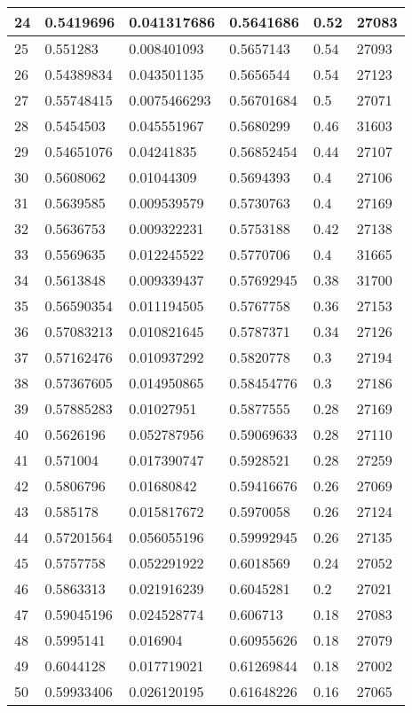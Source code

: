 \begin{longtable}{|l|l|l|l|l|l|}
24 & 0.5419696 & 0.041317686 & 0.5641686 & 0.52 & 27083 \\ \hline 
25 & 0.551283 & 0.008401093 & 0.5657143 & 0.54 & 27093 \\ \hline 
26 & 0.54389834 & 0.043501135 & 0.5656544 & 0.54 & 27123 \\ \hline 
27 & 0.55748415 & 0.0075466293 & 0.56701684 & 0.5 & 27071 \\ \hline 
28 & 0.5454503 & 0.045551967 & 0.5680299 & 0.46 & 31603 \\ \hline 
29 & 0.54651076 & 0.04241835 & 0.56852454 & 0.44 & 27107 \\ \hline 
30 & 0.5608062 & 0.01044309 & 0.5694393 & 0.4 & 27106 \\ \hline 
31 & 0.5639585 & 0.009539579 & 0.5730763 & 0.4 & 27169 \\ \hline 
32 & 0.5636753 & 0.009322231 & 0.5753188 & 0.42 & 27138 \\ \hline 
33 & 0.5569635 & 0.012245522 & 0.5770706 & 0.4 & 31665 \\ \hline 
34 & 0.5613848 & 0.009339437 & 0.57692945 & 0.38 & 31700 \\ \hline 
35 & 0.56590354 & 0.011194505 & 0.5767758 & 0.36 & 27153 \\ \hline 
36 & 0.57083213 & 0.010821645 & 0.5787371 & 0.34 & 27126 \\ \hline 
37 & 0.57162476 & 0.010937292 & 0.5820778 & 0.3 & 27194 \\ \hline 
38 & 0.57367605 & 0.014950865 & 0.58454776 & 0.3 & 27186 \\ \hline 
39 & 0.57885283 & 0.01027951 & 0.5877555 & 0.28 & 27169 \\ \hline 
40 & 0.5626196 & 0.052787956 & 0.59069633 & 0.28 & 27110 \\ \hline 
41 & 0.571004 & 0.017390747 & 0.5928521 & 0.28 & 27259 \\ \hline 
42 & 0.5806796 & 0.01680842 & 0.59416676 & 0.26 & 27069 \\ \hline 
43 & 0.585178 & 0.015817672 & 0.5970058 & 0.26 & 27124 \\ \hline 
44 & 0.57201564 & 0.056055196 & 0.59992945 & 0.26 & 27135 \\ \hline 
45 & 0.5757758 & 0.052291922 & 0.6018569 & 0.24 & 27052 \\ \hline 
46 & 0.5863313 & 0.021916239 & 0.6045281 & 0.2 & 27021 \\ \hline 
47 & 0.59045196 & 0.024528774 & 0.606713 & 0.18 & 27083 \\ \hline 
48 & 0.5995141 & 0.016904 & 0.60955626 & 0.18 & 27079 \\ \hline 
49 & 0.6044128 & 0.017719021 & 0.61269844 & 0.18 & 27002 \\ \hline 
50 & 0.59933406 & 0.026120195 & 0.61648226 & 0.16 & 27065 \\ \hline 
\end{longtable}